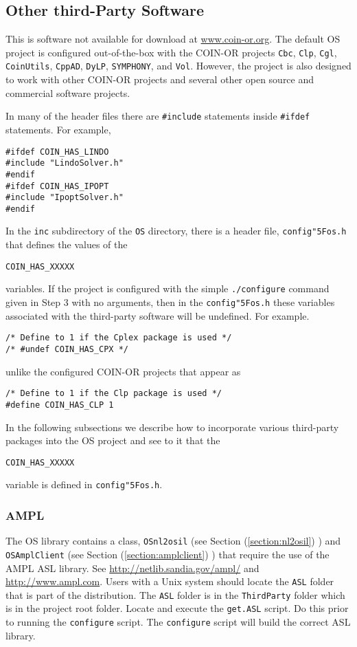 \documentclass[11pt]{article}
\renewcommand{\_}{{\char"5F}}
\renewcommand{\{}{{\char"7B}}
\renewcommand{\}}{{\char"7D}}
\renewcommand{\^}{{\char"0D}}
\renewcommand{\'}{{\char"0D}}
\begin{document}
\subsection{Other third-Party Software}

This is software not available for download at \url{www.coin-or.org}. The default OS project is configured out-of-the-box with the COIN-OR  projects {\tt Cbc}, {\tt Clp}, {\tt Cgl}, {\tt CoinUtils}, {\tt CppAD},  {\tt DyLP}, {\tt SYMPHONY}, and {\tt Vol}.  However, the project is also designed to work with other COIN-OR projects and several other open source and commercial software projects.

In many of the header files there are {\tt \#include} statements inside {\tt  \#ifdef}  statements. For example,
\begin{verbatim}
#ifdef COIN_HAS_LINDO
#include "LindoSolver.h"
#endif
#ifdef COIN_HAS_IPOPT
#include "IpoptSolver.h"
#endif
\end{verbatim}
In the {\tt inc} subdirectory of the {\tt OS}  directory, there is a header file, {\tt config\_os.h} that defines the values of the
\begin{verbatim}
COIN_HAS_XXXXX
\end{verbatim}
variables. If the project is configured with the simple {\tt ./configure} command given in Step 3 with no arguments, then in the {\tt config\_os.h} these variables associated with the third-party software will be undefined. For example.
\begin{verbatim}
/* Define to 1 if the Cplex package is used */
/* #undef COIN_HAS_CPX */
\end{verbatim}
unlike the configured COIN-OR projects that appear as
\begin{verbatim}
/* Define to 1 if the Clp package is used */
#define COIN_HAS_CLP 1
\end{verbatim}
In the following subsections we  describe how to incorporate various  third-party packages into the OS project and see to it that the
\begin{verbatim}
COIN_HAS_XXXXX
\end{verbatim}
variable is defined in  {\tt config\_os.h}.

\subsubsection{AMPL}

The OS library contains a class, {\tt OSnl2osil} (see Section (\ref{section:nl2osil}) ) and {\tt OSAmplClient} (see Section (\ref{section:amplclient}) ) that require the use of the AMPL ASL library.  See \url{http://netlib.sandia.gov/ampl/}  and  \url{http://www.ampl.com}. Users with a Unix system should locate the {\tt ASL} folder that is part of the distribution. The {\tt ASL} folder is in the {\tt ThirdParty} folder which is in the project root folder. Locate and execute the {\tt get.ASL} script.  Do this prior to running the {\tt configure} script. The {\tt configure} script will build the correct ASL library.
\end{document}
